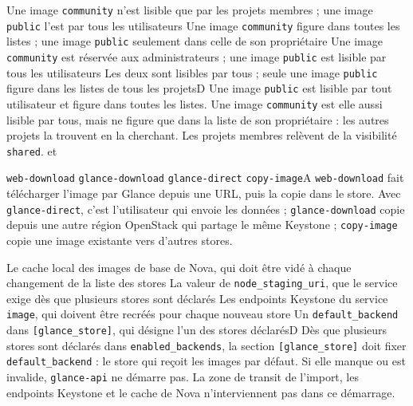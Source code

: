   {Une image \texttt{community} n'est lisible que par les projets membres ; une image \texttt{public} l'est par tous les utilisateurs}
  {Une image \texttt{community} figure dans toutes les listes ; une image \texttt{public} seulement dans celle de son propriétaire}
  {Une image \texttt{community} est réservée aux administrateurs ; une image \texttt{public} est lisible par tous les utilisateurs}
  {Les deux sont lisibles par tous ; seule une image \texttt{public} figure dans les listes de tous les projets}{D}
  {Une image \texttt{public} est lisible par tout utilisateur et figure dans toutes les listes. Une image \texttt{community} est elle aussi lisible par tous, mais ne figure que dans la liste de son propriétaire : les autres projets la trouvent en la cherchant. Les projets membres relèvent de la visibilité \texttt{shared}.}
  { et }

  {\texttt{web-download}}
  {\texttt{glance-download}}
  {\texttt{glance-direct}}
  {\texttt{copy-image}}{A}
  {\texttt{web-download} fait télécharger l'image par Glance depuis une URL, puis la copie dans le store. Avec \texttt{glance-direct}, c'est l'utilisateur qui envoie les données ; \texttt{glance-download} copie depuis une autre région OpenStack qui partage le même Keystone ; \texttt{copy-image} copie une image existante vers d'autres stores.}
  {}

  {Le cache local des images de base de Nova, qui doit être vidé à chaque changement de la liste des stores}
  {La valeur de \texttt{node\_staging\_uri}, que le service exige dès que plusieurs stores sont déclarés}
  {Les endpoints Keystone du service \texttt{image}, qui doivent être recréés pour chaque nouveau store}
  {Un \texttt{default\_backend} dans \texttt{[glance\_store]}, qui désigne l'un des stores déclarés}{D}
  {Dès que plusieurs stores sont déclarés dans \texttt{enabled\_backends}, la section \texttt{[glance\_store]} doit fixer \texttt{default\_backend} : le store qui reçoit les images par défaut. Si elle manque ou est invalide, \texttt{glance-api} ne démarre pas. La zone de transit de l'import, les endpoints Keystone et le cache de Nova n'interviennent pas dans ce démarrage.}
  {}

